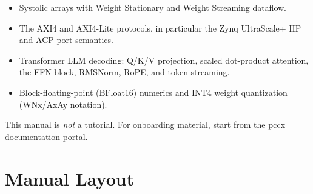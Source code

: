 \documentclass[11pt,a4paper,twoside,openany]{report}
\begin{document}
\begin{itemize}[label={\color{oceanblue}\textbullet}, leftmargin=*, itemsep=0.3ex]
  \item Systolic arrays with Weight Stationary and Weight Streaming dataflow.
  \item The AXI4 and AXI4-Lite protocols, in particular the Zynq
        UltraScale+ HP and ACP port semantics.
  \item Transformer LLM decoding: Q/K/V projection, scaled
        dot-product attention, the FFN block, RMSNorm, RoPE, and
        token streaming.
  \item Block-floating-point (BFloat16) numerics and INT4 weight
        quantization (WNx/AxAy notation).
\end{itemize}

This manual is \textit{not} a tutorial. For onboarding material,
start from the pccx documentation portal.

\section{Manual Layout}

\begin{center}
\label{fig:manual-layout}
\end{center}
\end{document}

